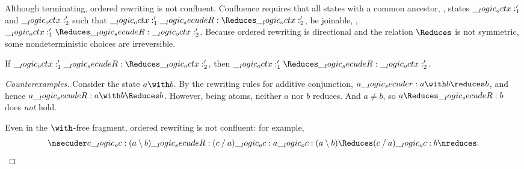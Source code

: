 Although terminating, ordered rewriting is not confluent.
Confluence requires that all states with a common ancestor, \ie, states $\__logic_octx:'_1$ and $\__logic_octx:'_2$ such that $\octx'_1 \secudeR\Reduces \octx'_2$, be joinable, \ie, $\octx'_1 \Reduces\secudeR \octx'_2$.
Because ordered rewriting is directional and the relation $\Reduces$ is not symmetric, some nondeterministic choices are irreversible.%
%
\begin{falseclaim}[Confluence]
  If\/ $\octx'_1 \secudeR\Reduces \octx'_2$, then $\octx'_1 \Reduces\secudeR \octx'_2$.
\end{falseclaim}
%
\begin{proof}[Counterexamples]
  Consider the state $a \with b$.
  By the rewriting rules for additive conjunction, $a \secuder a \with b \reduces b$, and hence $a \secudeR a \with b \Reduces b$.
  However, being atoms, neither $a$ nor $b$ reduces.
  And $a \neq b$, so $a \Reduces\secudeR b$ does \emph{not} hold.

  Even in the $\with$-free fragment, ordered rewriting is not confluent:
  for example,
  \begin{equation*}
    \nsecuder c \oc (a \limp b) \secudeR (c \pmir a) \oc a \oc (a \limp b) \Reduces (c \pmir a) \oc b \nreduces
    .
    \qedhere
  \end{equation*}
\end{proof}










